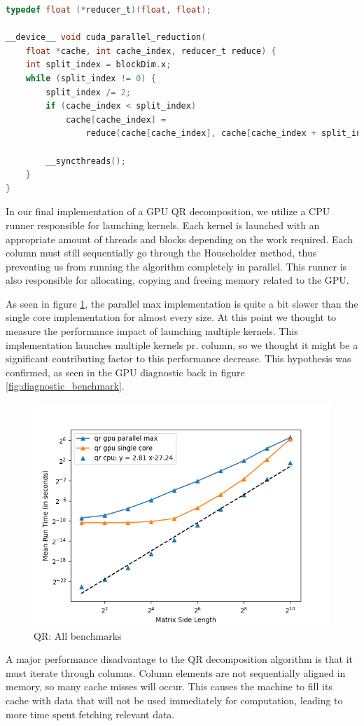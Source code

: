 \begin{lstlisting}[language=C, caption={Parallel Reduction}, label={lst:parallel_reduce}]
typedef float (*reducer_t)(float, float);

__device__ void cuda_parallel_reduction(
    float *cache, int cache_index, reducer_t reduce) {
    int split_index = blockDim.x;
    while (split_index != 0) {
        split_index /= 2;
        if (cache_index < split_index)
            cache[cache_index] =
                reduce(cache[cache_index], cache[cache_index + split_index]);

        __syncthreads();
    }
}
\end{lstlisting}

In our final implementation of a GPU QR decomposition, we utilize a CPU runner responsible for launching kernels. Each kernel is launched with an appropriate amount of threads and blocks depending on the work required. Each column must still sequentially go through the Householder method, thus preventing us from running the algorithm completely in parallel. This runner is also responsible for allocating, copying and freeing memory related to the GPU. 

As seen in figure \ref{fig:qr_parallel}, the parallel max implementation is quite a bit slower than the single core implementation for almost every size. At this point we thought to measure the performance impact of launching multiple kernels. This implementation launches multiple kernels pr. column, so we thought it might be a significant contributing factor to this performance decrease. This hypothesis was confirmed, as seen in the GPU diagnostic back in figure \ref{fig:diagnostic_benchmark}.


\begin{figure}[h]
  \includegraphics[width=\textwidth]{SavedBenchmarksAndDiagrams/Machine 2/QR/GPU Parallel Max.png}
  \centering
  \caption{QR: All benchmarks}
  \label{fig:qr_parallel}
\end{figure}


A major performance disadvantage to the QR decomposition algorithm is that it must iterate through columns. Column elements are not sequentially aligned in memory, so many cache misses will occur. This causes the machine to fill its cache with data that will not be used immediately for computation, leading to more time spent fetching relevant data. 
